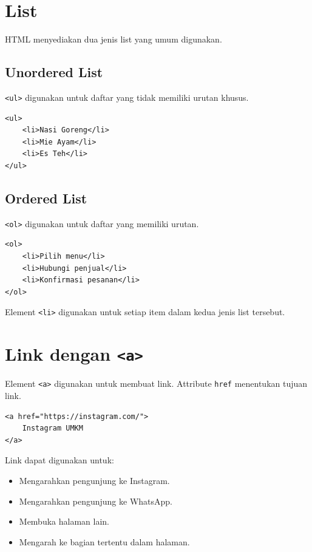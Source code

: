 \documentclass[11pt,a4paper]{article}
\begin{document}
\section{List}

HTML menyediakan dua jenis list yang umum digunakan.

\subsection{Unordered List}

\texttt{<ul>} digunakan untuk daftar yang tidak memiliki urutan khusus.

\begin{lstlisting}[style=htmlstyle]
<ul>
    <li>Nasi Goreng</li>
    <li>Mie Ayam</li>
    <li>Es Teh</li>
</ul>
\end{lstlisting}

\subsection{Ordered List}

\texttt{<ol>} digunakan untuk daftar yang memiliki urutan.

\begin{lstlisting}[style=htmlstyle]
<ol>
    <li>Pilih menu</li>
    <li>Hubungi penjual</li>
    <li>Konfirmasi pesanan</li>
</ol>
\end{lstlisting}

Element \texttt{<li>} digunakan untuk setiap item dalam kedua jenis list tersebut.

\section{Link dengan \texttt{<a>}}

Element \texttt{<a>} digunakan untuk membuat link. Attribute \texttt{href} menentukan tujuan link.

\begin{lstlisting}[style=htmlstyle]
<a href="https://instagram.com/">
    Instagram UMKM
</a>
\end{lstlisting}

Link dapat digunakan untuk:

\begin{itemize}
    \item Mengarahkan pengunjung ke Instagram.
    \item Mengarahkan pengunjung ke WhatsApp.
    \item Membuka halaman lain.
    \item Mengarah ke bagian tertentu dalam halaman.
\end{itemize}
\end{document}
